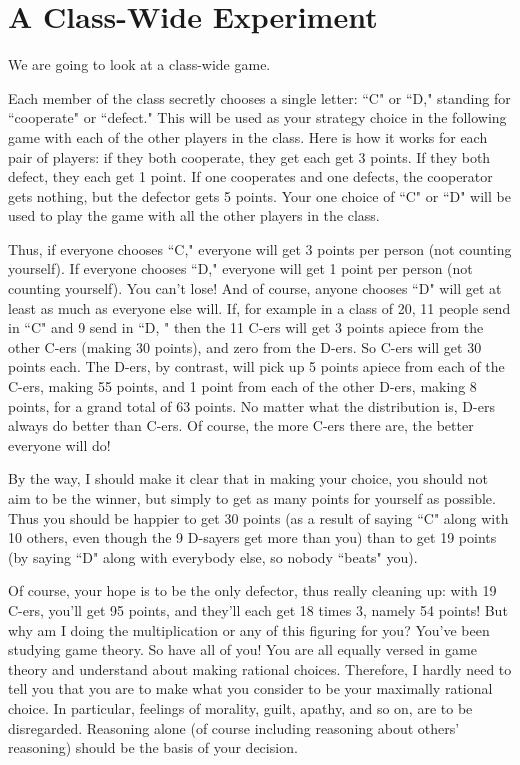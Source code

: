 \section{A Class-Wide Experiment}

We are going to look at a class-wide game. 


Each member of the class secretly chooses a single letter: ``C" or ``D," standing for ``cooperate" or ``defect." This will be used as your strategy choice in the following game with each of the other players in the class. Here is how it works for each pair of players:  if they both cooperate, they get each get 3 points. If they both defect, they each get 1 point. If one cooperates and one defects, the cooperator gets nothing, but the defector gets 5 points. Your one choice of ``C" or ``D" will be used to play the game with all the other players in the class. 

Thus, if everyone chooses ``C," everyone will get 3 points per person (not counting yourself). If everyone chooses ``D," everyone will get  1 point per person (not counting yourself). You can't lose! And of course, anyone chooses ``D" will get at least as much as everyone else will. If, for example in a class of 20, 11 people send in ``C" and 9 send in ``D, " then the 11 C-ers will get 3 points apiece from the other C-ers (making 30 points), and zero from the D-ers. So C-ers will get 30 points each. The D-ers, by contrast, will pick up 5 points apiece from each of the C-ers, making 55 points, and 1 point from each of the other D-ers, making 8 points, for a grand total of 63 points. No matter what the distribution is, D-ers always do better than C-ers. Of course, the more C-ers there are, the better everyone will do!

By the way, I should make it clear that in making your choice, you should not aim to be the winner, but simply to get as many points for yourself as possible. Thus you should be happier to get 30 points (as a result of saying ``C" along with 10 others, even though the 9 D-sayers get more than you) than to get 19 points (by saying ``D" along with everybody else, so nobody ``beats" you). 

Of course, your hope is to be the only defector, thus really cleaning up: with 19 C-ers, you'll get 95 points, and they'll each get 18 times 3, namely 54 points! But why am I doing the multiplication or any of this figuring for you? You've been studying game theory. So have all of you! You are all equally versed in game theory and understand about making rational choices. Therefore, I hardly need to tell you that you are to make what you consider to be your maximally rational choice. In particular, feelings of morality, guilt, apathy, and so on, are to be disregarded. Reasoning alone (of course including reasoning about others' reasoning) should be the basis of your decision.

